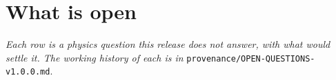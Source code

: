 %
%
\section{What is open}
\label{sec:open-questions}

\emph{Each row is a physics question this release does not answer, with what
would settle it. The working history of each is in}
\texttt{provenance/OPEN-QUESTIONS-v1.0.0.md}.

